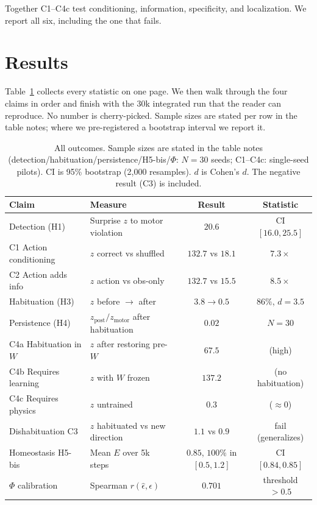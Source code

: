 \documentclass[11pt,a4paper]{article}
\begin{document}
Together C1--C4c test conditioning, information, specificity, and localization. We report all six, including the one that fails.

\section{Results}
\label{sec:results}

Table~\ref{tab:main} collects every statistic on one page. We then walk through the four claims in order and finish with the 30k integrated run that the reader can reproduce. No number is cherry-picked. Sample sizes are stated per row in the table notes; where we pre-registered a bootstrap interval we report it.

\begin{table}[h]
\centering
\caption{All outcomes. Sample sizes are stated in the table notes (detection/habituation/persistence/H5-bis/$\Phi$: $N=30$ seeds; C1--C4c: single-seed pilots). CI is 95\% bootstrap (2,000 resamples). $d$ is Cohen's $d$. The negative result (C3) is included.}
\label{tab:main}
\begin{tabular}{@{}llcc@{}}
\toprule
Claim & Measure & Result & Statistic \\
\midrule
Detection (H1) & Surprise $z$ to motor violation & $20.6$ & CI $[16.0, 25.5]$ \\
C1 Action conditioning & $z$ correct vs shuffled & $132.7$ vs $18.1$ & $7.3\times$ \\
C2 Action adds info & $z$ action vs obs-only & $132.7$ vs $15.5$ & $8.5\times$ \\
Habituation (H3) & $z$ before $\rightarrow$ after & $3.8 \rightarrow 0.5$ & $86\%$, $d=3.5$ \\
Persistence (H4) & $z_{\mathrm{post}}/z_{\mathrm{motor}}$ after habituation & $0.02$ & $N=30$ \\
C4a Habituation in $W$ & $z$ after restoring pre-$W$ & $67.5$ & (high) \\
C4b Requires learning & $z$ with $W$ frozen & $137.2$ & (no habituation) \\
C4c Requires physics & $z$ untrained & $0.3$ & ($\approx 0$) \\
Dishabituation C3 & $z$ habituated vs new direction & $1.1$ vs $0.9$ & fail (generalizes) \\
Homeostasis H5-bis & Mean $E$ over 5k steps & $0.85$, $100\%$ in $[0.5,1.2]$ & CI $[0.84, 0.85]$ \\
$\Phi$ calibration & Spearman $r(\hat\epsilon,\epsilon)$ & $0.701$ & threshold $>0.5$ \\

\end{tabular}
\end{table}
\end{document}
